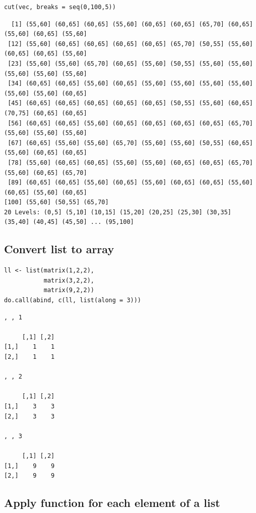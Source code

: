 \documentclass{article}
\begin{document}
\lstset{language=r,label= ,caption= ,captionpos=b,numbers=none}
\begin{lstlisting}
cut(vec, breaks = seq(0,100,5))
\end{lstlisting}

\begin{verbatim}
  [1] (55,60] (60,65] (60,65] (55,60] (60,65] (60,65] (65,70] (60,65] (55,60] (60,65] (55,60]
 [12] (55,60] (60,65] (60,65] (60,65] (60,65] (65,70] (50,55] (55,60] (60,65] (60,65] (55,60]
 [23] (55,60] (55,60] (65,70] (60,65] (55,60] (50,55] (55,60] (55,60] (55,60] (55,60] (55,60]
 [34] (60,65] (60,65] (55,60] (60,65] (55,60] (55,60] (55,60] (55,60] (55,60] (55,60] (60,65]
 [45] (60,65] (60,65] (60,65] (60,65] (60,65] (50,55] (55,60] (60,65] (70,75] (60,65] (60,65]
 [56] (60,65] (60,65] (55,60] (60,65] (60,65] (60,65] (60,65] (65,70] (55,60] (55,60] (55,60]
 [67] (60,65] (55,60] (55,60] (65,70] (55,60] (55,60] (50,55] (60,65] (55,60] (60,65] (60,65]
 [78] (55,60] (60,65] (60,65] (55,60] (55,60] (60,65] (60,65] (65,70] (55,60] (60,65] (65,70]
 [89] (60,65] (60,65] (55,60] (60,65] (55,60] (60,65] (60,65] (55,60] (60,65] (55,60] (60,65]
[100] (55,60] (50,55] (65,70]
20 Levels: (0,5] (5,10] (10,15] (15,20] (20,25] (25,30] (30,35] (35,40] (40,45] (45,50] ... (95,100]
\end{verbatim}

\subsection{Convert list to array}
\label{sec:org119751c}

\lstset{language=r,label= ,caption= ,captionpos=b,numbers=none}
\begin{lstlisting}
ll <- list(matrix(1,2,2),
		   matrix(3,2,2),
		   matrix(9,2,2))
do.call(abind, c(ll, list(along = 3)))
\end{lstlisting}

\begin{verbatim}
, , 1

     [,1] [,2]
[1,]    1    1
[2,]    1    1

, , 2

     [,1] [,2]
[1,]    3    3
[2,]    3    3

, , 3

     [,1] [,2]
[1,]    9    9
[2,]    9    9
\end{verbatim}

\subsection{Apply function for each element of a list}
\label{sec:orgcce3159}
\end{document}
